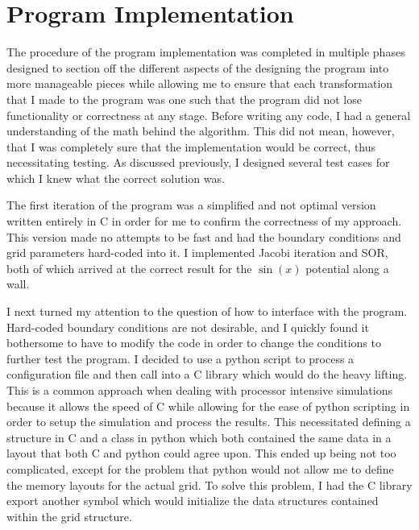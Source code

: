 \section{Program Implementation}
\label{app:des}
The procedure of the program implementation was completed in multiple phases designed to section off
the different aspects of the designing the program into more manageable pieces while allowing me to ensure
that each transformation that I made to the program was one such that the program did not lose functionality
or correctness at any stage. Before writing any code, I had a general understanding of the math behind the
algorithm. This did not mean, however, that I was completely sure that the implementation would be correct,
thus necessitating testing. As discussed previously, I designed several test cases for which I knew what the
correct solution was.

The first iteration of the program was a simplified and not optimal version written entirely
in C in order for me to confirm the correctness of my approach. This version made no attempts to
be fast and had the boundary conditions and grid parameters hard-coded into it. I implemented
Jacobi iteration and SOR, both of which arrived at the correct result for the $\sin(x)$ potential
along a wall.

I next turned my attention to the question of how to interface with the program. Hard-coded boundary conditions
are not desirable, and I quickly found it bothersome to have to modify the code in order to change the conditions
to further test the program. I decided to use a python script to process a configuration file and then call into a
C library which would do the heavy lifting. This is a common approach when dealing with processor intensive simulations
because it allows the speed of C while allowing for the ease of python scripting in order to setup the simulation and
process the results. This necessitated defining a structure in C and a class in python which both contained the same
data in a layout that both C and python could agree upon. This ended up being not too complicated, except for the problem
that python would not allow me to define the memory layouts for the actual grid. To solve this problem, I had the C library
export another symbol which would initialize the data structures contained within the grid structure.

